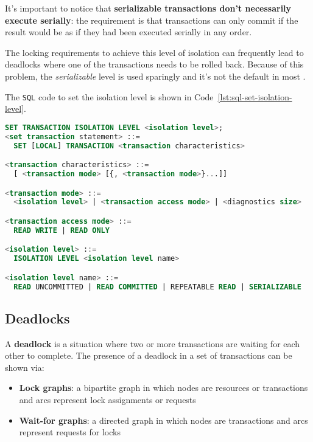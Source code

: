\documentclass[english]{article}
\begin{document}
\bigskip
It's important to notice that \textbf{serializable transactions don't necessarily execute serially}:
the requirement is that transactions can only commit if the result would be as if they had been executed serially in any order.

The locking requirements to achieve this level of isolation can frequently lead to deadlocks where one of the transactions needs to be rolled back.
Because of this problem, the \textit{serializable} level is used sparingly and it's not the default in most \dbms.

\bigskip
The \texttt{SQL} code to set the isolation level is shown in Code~\ref{lst:sql-set-isolation-level}.

\begin{minipage}{\textwidth}
  \bigskip
  \begin{lstlisting}[language=SQL, caption={\texttt{SQL} statement to set the isolation level of a transaction}, label={lst:sql-set-isolation-level}]
SET TRANSACTION ISOLATION LEVEL <isolation level>;
<set transaction statement> ::=
  SET [LOCAL] TRANSACTION <transaction characteristics>

<transaction characteristics> ::=
  [ <transaction mode> [{, <transaction mode>}...]]

<transaction mode> ::=
  <isolation level> | <transaction access mode> | <diagnostics size>

<transaction access mode> ::=
  READ WRITE | READ ONLY

<isolation level> ::=
  ISOLATION LEVEL <isolation level name>

<isolation level name> ::=
  READ UNCOMMITTED | READ COMMITTED | REPEATABLE READ | SERIALIZABLE
\end{lstlisting}
\end{minipage}

\subsection{Deadlocks}
\label{sec:deadlocks}

A \textbf{deadlock} is a situation where two or more transactions are waiting for each other to complete.
The presence of a deadlock in a set of transactions can be shown via:

\begin{itemize}
  \item \textbf{Lock graphs}: a bipartite graph in which nodes are resources or transactions and arcs represent lock assignments or requests
  \item \textbf{Wait-for graphs}: a directed graph in which nodes are transactions and arcs represent requests for locks
\end{itemize}
\end{document}
